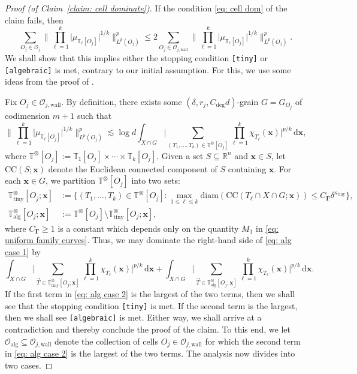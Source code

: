 \documentclass[reqno]{amsart}
\numberwithin{equation}{section}
\newcommand{\R}{\mathbb{R}}
\newcommand{\T}{\mathbb{T}}
\newcommand{\cO}{\mathcal{O}}
\newcommand{\ud}{\mathrm{d}}
\newcommand{\bx}{\mathbf{x}}
\newcommand{\bdGamma}{\boldsymbol{\Gamma}}
\theoremstyle{plain}
\theoremstyle{definition}
\newcommand{\ttiny}{\mathrm{tiny}}
\newcommand{\alg}{\mathrm{alg}}
\newcommand{\wall}{\mathrm{wall}}
\newcommand{\CC}{\mathrm{CC}}
\newcommand{\diam}{\mathrm{diam}}
\begin{document}
\begin{proof}[Proof (of Claim~\ref{claim: cell dominate})] If the condition \eqref{eq: cell dom} of the claim fails, then 
\begin{equation}\label{eq: alg dom}
   \sum_{O_j \in \cO_j} \Big\|\prod_{\ell = 1}^k \big| \mu_{\T_{\ell}[O_j]} \big|^{1/k} \Big\|_{L^p(O_j)}^p \leq 2 \sum_{O_j \in \cO_{j,\wall}} \Big\|\prod_{\ell = 1}^k \big| \mu_{\T_{\ell}[O_j]} \big|^{1/k} \Big\|_{L^p(O_j)}^p.
\end{equation} 
We shall show that this implies either the stopping condition \texttt{[tiny]} or \texttt{[algebraic]} is met, contrary to our initial assumption. For this, we use some ideas from the proof of \cite[Proposition 3.1]{GZ2018}.

Fix $O_j \in \cO_{j,\wall}$. By definition, there exists some $(\delta, r_j, C_{\deg} d)$-grain $G = G_{O_j}$ of codimension $m+1$ such that
\begin{equation}\label{eq: alg case 1}
   \Big\|\prod_{\ell = 1}^k \big| \mu_{\T_{\ell}[O_j]} \big|^{1/k} \Big\|_{L^p(O_j)}^p \lesssim \log d \int_{X \cap G} \Big|\sum_{(T_1, \dots, T_k) \in \T^{\otimes}[O_j]} \prod_{\ell = 1}^k \chi_{T_{\ell}}(\bx) \Big|^{p/k} \,\ud \bx,
\end{equation}
where $\T^{\otimes}[O_j] := \T_1[O_j] \times \cdots \times \T_k[O_j]$. Given a set $S \subseteq \R^n$ and $\bx \in S$, let $\CC(S;\bx)$ denote the Euclidean connected component of $S$ containing $\bx$. For each $\bx \in G$, we partition $\T^{\otimes}[O_j]$ into two sets:
\begin{align}
\nonumber
  \T^{\otimes}_{\ttiny}[O_j;\bx] &:=  \Big\{(T_1, \dots, T_k) \in \T^{\otimes}[O_j] : \max_{1 \leq \ell \leq k} \diam(\CC(T_{\ell} \cap X \cap G;\bx)) \leq C_{\bdGamma}\delta^{\kappa_{\ttiny}} \Big\}, \\
  \label{eq: alg tube set}
 \T^{\otimes}_{\alg}[O_j;\bx] &:= \T^{\otimes}[O_j] \setminus  \T^{\otimes}_{\ttiny}[O_j;\bx],
\end{align}
where $C_{\bdGamma} \geq 1$ is a constant which depends only on the quantity $M_1$ in \eqref{eq: uniform family curves}. Thus, we may dominate the right-hand side of \eqref{eq: alg case 1} by
\begin{equation}\label{eq: alg case 2}
    \int_{X \cap G} \Big|\sum_{\vec{T} \in \T^{\otimes}_{\ttiny}[O_j;\bx]} \prod_{\ell = 1}^k \chi_{T_\ell}(\bx)  \Big|^{p/k} \,\ud \bx + \int_{X \cap G} \Big|\sum_{\vec{T} \in \T^{\otimes}_{\alg}[O_j;\bx]}  \prod_{\ell = 1}^k \chi_{T_\ell}(\bx) \Big|^{p/k} \,\ud \bx.
\end{equation}
If the first term in \eqref{eq: alg case 2} is the largest of the two terms, then we shall see that the stopping condition \texttt{[tiny]} is met. If the second term is the largest, then we shall see \texttt{[algebraic]} is met. Either way, we shall arrive at a contradiction and thereby conclude the proof of the claim. To this end, we let $\cO_{\alg} \subseteq \cO_{j,\wall}$ denote the collection of cells $O_j \in \cO_{j,\wall}$ for which the second term in \eqref{eq: alg case 2} is the largest of the two terms. The analysis now divides into two cases.\medskip


\end{proof}
\end{document}
